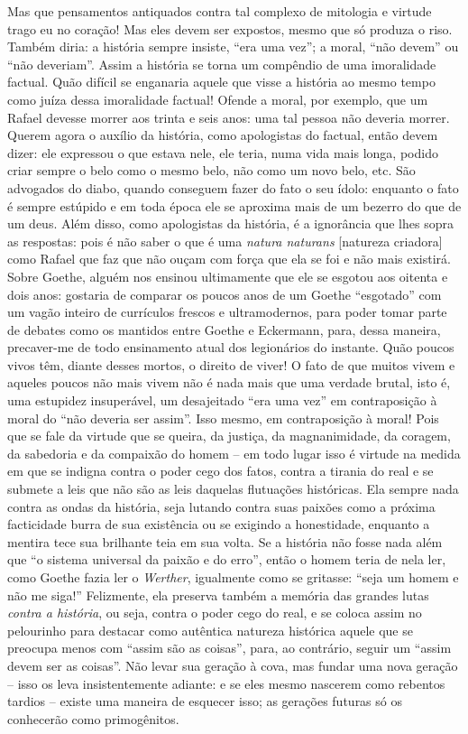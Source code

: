Mas que pensamentos antiquados contra tal complexo de mitologia e
virtude trago eu no coração! Mas eles devem ser expostos, mesmo que só
produza o riso. Também diria: a história sempre insiste, ``era uma
vez''; a moral, ``não devem'' ou ``não deveriam''. Assim a história se
torna um compêndio de uma imoralidade factual. Quão difícil se enganaria
aquele que visse a história ao mesmo tempo como juíza dessa imoralidade
factual! Ofende a moral, por exemplo, que um Rafael devesse morrer aos
trinta e seis anos: uma tal pessoa não deveria morrer. Querem agora o
auxílio da história, como apologistas do factual, então devem dizer: ele
expressou o que estava nele, ele teria, numa vida mais longa, podido
criar sempre o belo como o mesmo belo, não como um novo belo, etc. São
advogados do diabo, quando conseguem fazer do fato o seu ídolo: enquanto
o fato é sempre estúpido e em toda época ele se aproxima mais de um
bezerro do que de um deus. Além disso, como apologistas da história, é a
ignorância que lhes sopra as respostas: pois é não saber o que é uma
\emph{natura naturans} {[}natureza criadora{]} como Rafael que faz que
não ouçam com força que ela se foi e não mais existirá. Sobre Goethe,
alguém nos ensinou ultimamente que ele se esgotou aos oitenta e dois
anos: gostaria de comparar os poucos anos de um Goethe ``esgotado'' com
um vagão inteiro de currículos frescos e ultramodernos, para poder tomar
parte de debates como os mantidos entre Goethe e Eckermann, para, dessa
maneira, precaver-me de todo ensinamento atual dos legionários do
instante. Quão poucos vivos têm, diante desses mortos, o direito de
viver! O fato de que muitos vivem e aqueles poucos não mais vivem não é
nada mais que uma verdade brutal, isto é, uma estupidez insuperável, um
desajeitado ``era uma vez'' em contraposição à moral do ``não deveria
ser assim''. Isso mesmo, em contraposição à moral! Pois que se fale da
virtude que se queira, da justiça, da magnanimidade, da coragem, da
sabedoria e da compaixão do homem -- em todo lugar isso é virtude na
medida em que se indigna contra o poder cego dos fatos, contra a tirania
do real e se submete a leis que não são as leis daquelas flutuações
históricas. Ela sempre nada contra as ondas da história, seja lutando
contra suas paixões como a próxima facticidade burra de sua existência
ou se exigindo a honestidade, enquanto a mentira tece sua brilhante teia
em sua volta. Se a história não fosse nada além que ``o sistema
universal da paixão e do erro'', então o homem teria de nela ler, como
Goethe fazia ler o \emph{Werther}, igualmente como se gritasse: ``seja
um homem e não me siga!'' Felizmente, ela preserva também a memória das
grandes lutas \emph{contra a história}, ou seja, contra o poder cego do
real, e se coloca assim no pelourinho para destacar como autêntica
natureza histórica aquele que se preocupa menos com ``assim são as
coisas'', para, ao contrário, seguir um ``assim devem ser as coisas''.
Não levar sua geração à cova, mas fundar uma nova geração -- isso os
leva insistentemente adiante: e se eles mesmo nascerem como rebentos
tardios -- existe uma maneira de esquecer isso; as gerações futuras só
os conhecerão como primogênitos.

